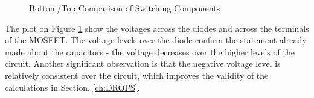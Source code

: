 \begin{figure}[H]%
    \centering
   \qquad
    \caption{Bottom/Top Comparison of Switching Components}%
     \label{fig:bottopswitch}%
\end{figure}

The plot on Figure \ref{fig:bottopswitch} show the voltages across the diodes and across the terminals of the MOSFET.
The voltage levels over the diode confirm the statement already made about the capacitors - the voltage decreases over the higher levels of the circuit.
Another significant observation is that the negative voltage level is relatively consistent over the circuit, which improves the validity of the calculations in Section. \ref{ch:DROPS}.

